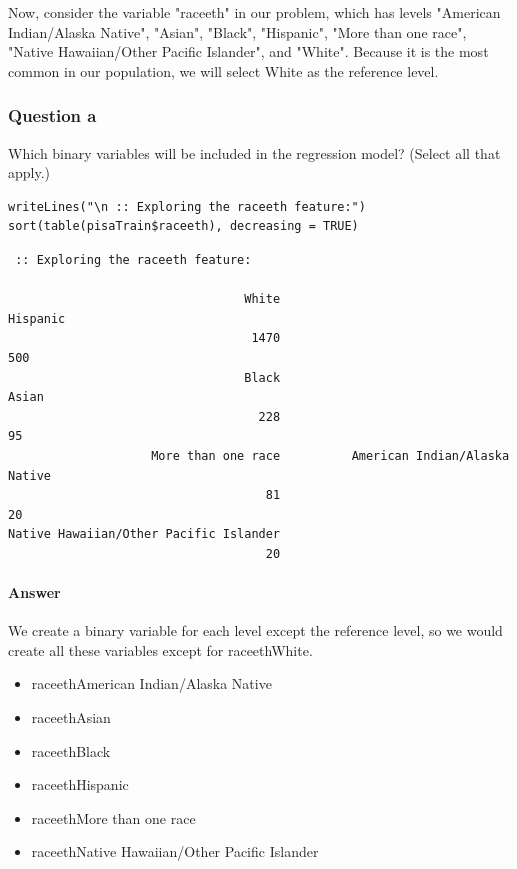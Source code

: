 \documentclass[letterpaper, 9pt, onecolumn, twoside, technote, final]{IEEEtran}
\begin{document}
Now, consider the variable "raceeth" in our problem, which has levels
"American Indian/Alaska Native", "Asian", "Black", "Hispanic", "More
than one race", "Native Hawaiian/Other Pacific Islander", and
"White". Because it is the most common in our population, we will
select White as the reference level.

\subsubsection{Question a}
\label{sec-2-6-1}

Which binary variables will be included in the regression model?
(Select all that apply.)

\begin{verbatim}
writeLines("\n :: Exploring the raceeth feature:")
sort(table(pisaTrain$raceeth), decreasing = TRUE)
\end{verbatim}

\begin{verbatim}
 :: Exploring the raceeth feature:

                                 White                               Hispanic
                                  1470                                    500
                                 Black                                  Asian
                                   228                                     95
                    More than one race          American Indian/Alaska Native
                                    81                                     20
Native Hawaiian/Other Pacific Islander
                                    20
\end{verbatim}

\paragraph{Answer}
\label{sec-2-6-1-1}

We create a binary variable for each level except the reference
level, so we would create all these variables except for
raceethWhite.

\begin{itemize}
\item raceethAmerican Indian/Alaska Native
\item raceethAsian
\item raceethBlack
\item raceethHispanic
\item raceethMore than one race
\item raceethNative Hawaiian/Other Pacific Islander
\end{itemize}
\end{document}

